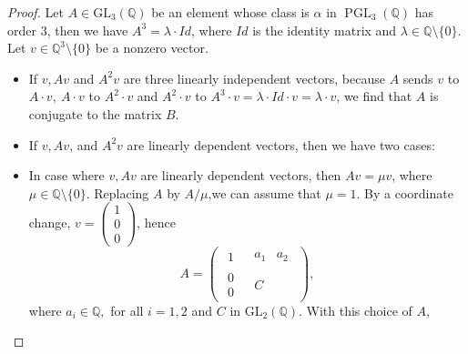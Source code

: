 \documentclass[leqno,12pt]{amsart} %
\newcommand{\Q}{\ensuremath{\mathbb{Q} }}
\DeclareMathOperator{\PGL}{PGL}
\begin{document}
\begin{proof}
    Let $A\in\mathrm{GL}_3(\Q )$ be an element whose class is $\alpha$ in $\PGL _3(\Q )$ has order $3$, then we have $A^3=\lambda\cdot Id$, where $Id$ is the identity matrix and $\lambda\in\Q \setminus\{0\}$. Let $v\in\Q ^3\setminus\{0\}$ be a nonzero vector.
  \begin{itemize}
        \item [(a)] If $v, Av$ and $A^2v$ are three linearly independent vectors, because $A$ sends $v$ to $A\cdot v,~A\cdot v$ to $A^2\cdot v$ and $A^2\cdot v$ to $A^3\cdot v=\lambda \cdot Id\cdot v=\lambda \cdot v$, we find that $A$ is conjugate to the matrix $B$.
        \item [(b)] If $v, Av$, and $A^2v$ are linearly dependent vectors, then we have two cases:
\end{itemize}
        \begin{itemize}
            \item [(b.1)] In case where $v, Av$ are linearly dependent vectors, then $Av=\mu v$, where $\mu \in \Q \setminus\{0\}$. Replacing $A$ by $A/\mu$,we can assume that $\mu=1$. By a coordinate change, $v=\left(\begin{array}{c}
                 1\\
                 0\\0 
            \end{array}\right)$, hence
\[A=\left(
  \begin{array}{ccc}
\begin{matrix}
    1
\end{matrix}
&
\begin{matrix}
    a_{1} & a_{2}
\end{matrix}\\
\begin{matrix}
    0\\0
\end{matrix}&
\begin{matrix}
    C
\end{matrix}
\end{array}
\right),
\]
where $a_i\in\Q ,$ for all $i=1,2$ and $C$ in $\mathrm{GL}_2(\Q )$. With this choice of $A$,


\end{itemize}
\end{proof}
\end{document}
